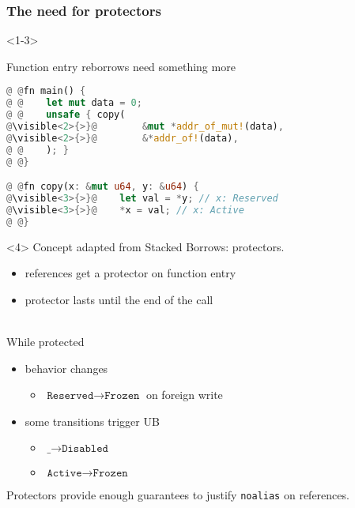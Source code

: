 \begin{frame}[fragile]
    \frametitle{The need for protectors}
    \begin{onlyenv}<1-3>
        \begin{block}{Function entry reborrows need something more}
            \begin{lstlisting}[language=rust, escapechar=@]
@ @fn main() {
@ @    let mut data = 0;
@ @    unsafe { copy(
@\visible<2>{>}@        &mut *addr_of_mut!(data),
@\visible<2>{>}@        &*addr_of!(data),
@ @    ); }
@ @}

@ @fn copy(x: &mut u64, y: &u64) {
@\visible<3>{>}@    let val = *y; // x: Reserved
@\visible<3>{>}@    *x = val; // x: Active
@ @}

            \end{lstlisting}
        \end{block}
    \end{onlyenv}

    \begin{onlyenv}<4>
        Concept adapted from Stacked Borrows: protectors.
        \begin{itemize}
            \item references get a protector on function entry
            \item protector lasts until the end of the call
        \end{itemize}
        ~\\
        While protected
        \begin{itemize}
            \item behavior changes
                \begin{itemize}
                    \item \(\texttt{Reserved} \to \texttt{Frozen}\) on foreign write
                \end{itemize}
            \item some transitions trigger UB
                \begin{itemize}
                    \item \(\texttt{\_} \to \texttt{Disabled}\)
                    \item \(\texttt{Active} \to \texttt{Frozen}\)
                \end{itemize}
        \end{itemize}

        \begin{block}
            Protectors provide enough guarantees to justify \texttt{noalias} on
            references.
        \end{block}
    \end{onlyenv}
\end{frame}
